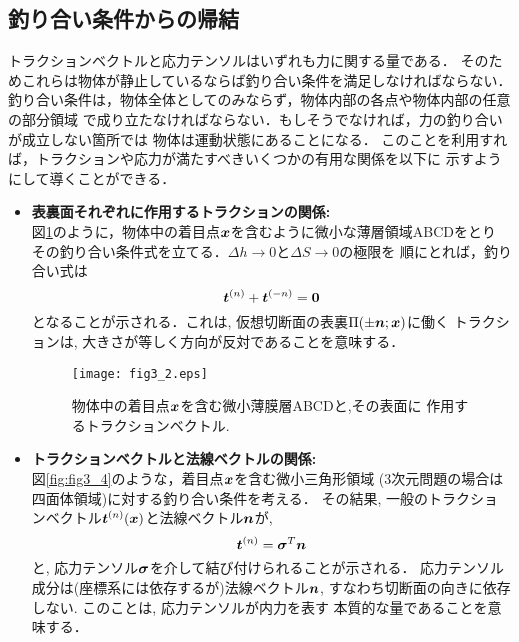 \documentclass[10pt,a4j]{jbook}
\begin{document}
\subsection{釣り合い条件からの帰結}\label{equib}
トラクションベクトルと応力テンソルはいずれも力に関する量である．
そのためこれらは物体が静止しているならば釣り合い条件を満足しなければならない．
釣り合い条件は，物体全体としてのみならず，物体内部の各点や物体内部の任意の部分領域
で成り立たなければならない．もしそうでなければ，力の釣り合いが成立しない箇所では
物体は運動状態にあることになる．
このことを利用すれば，トラクションや応力が満たすべきいくつかの有用な関係を以下に
示すようにして導くことができる．
\begin{itemize}
\item
	{\bf 表裏面それぞれに作用するトラクションの関係:}\\
	図\ref{fig:fig3_2}のように，物体中の着目点$\mbox{\boldmath $x$}$を含むように微小な薄層領域ABCDをとり
	その釣り合い条件式を立てる．$\Delta h \rightarrow 0$と$\Delta S\rightarrow 0$の極限を
	順にとれば，釣り合い式は
	\begin{equation}
		\mbox{\boldmath $t$}^{(n)}+\mbox{\boldmath $t$}^{(-n)}=\mbox{\boldmath $0$}
		\label{eqn:t_pmn}
	\end{equation}
	となることが示される．これは, 仮想切断面の表裏$\Pi(\pm \mbox{\boldmath $n$};\mbox{\boldmath $x$})$に働く
	トラクションは, 大きさが等しく方向が反対であることを意味する．
	\begin{figure}[h]
	\begin{center}
	\texttt{[image: fig3\_2.eps]} 
	\end{center}
	\caption{物体中の着目点$\mbox{\boldmath $x$}$を含む微小薄膜層ABCDと,その表面に
	作用するトラクションベクトル. } 
	\label{fig:fig3_2}
	\end{figure}
\item
	{\bf トラクションベクトルと法線ベクトルの関係:}\\
	図\ref{fig:fig3_4}のような，着目点$\mbox{\boldmath $x$}$を含む微小三角形領域
	(3次元問題の場合は四面体領域)に対する釣り合い条件を考える．
	その結果, 一般のトラクションベクトル$\mbox{\boldmath $t$}^{(n)}(\mbox{\boldmath $x$})$と法線ベクトル$\mbox{\boldmath $n$}$が, 
	\begin{equation}
		\mbox{\boldmath $t$}^{(n)}=\mbox{\boldmath $\sigma$}^{T}\mbox{\boldmath $n$}
		\label{eqn:t_as_sign}
	\end{equation}
	と, 応力テンソル$\mbox{\boldmath $\sigma$}$を介して結び付けられることが示される．
	応力テンソル成分は(座標系には依存するが)法線ベクトル$\mbox{\boldmath $n$}$, 
	すなわち切断面の向きに依存しない. このことは, 応力テンソルが内力を表す
	本質的な量であることを意味する．
	\begin{figure}[h]

\end{figure}
\end{itemize}
\end{document}
